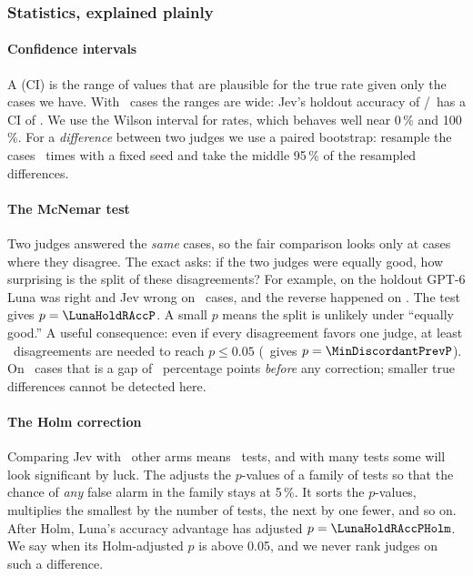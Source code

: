 \subsubsection{Statistics, explained plainly}\label{jb:sec:stats}

\paragraph{Confidence intervals} A  (CI) is the range of values that
are plausible for the true rate given only the cases we have. With \HoldN\ cases the ranges are wide:
Jev's holdout accuracy of \JevHoldAccK/\HoldN\ has a CI of \JevHoldAccCI. We use the Wilson interval for
rates, which behaves well near 0\,\% and 100\,\%. For a \emph{difference} between two judges we use a
paired bootstrap: resample the cases \BootstrapB\ times with a fixed seed and take the middle 95\,\% of
the resampled differences.

\paragraph{The McNemar test} Two judges answered the \emph{same} cases, so the fair comparison looks
only at cases where they disagree. The exact  asks: if the two judges were equally
good, how surprising is the split of these disagreements? For example, on the holdout GPT-6 Luna was
right and Jev wrong on \LunaHoldRAccCandOnly\ cases, and the reverse happened on
\LunaHoldRAccBaseOnly. The test gives $p = \LunaHoldRAccP$. A small $p$ means the split is unlikely
under ``equally good.'' A useful consequence: even if every disagreement favors one judge, at least
\MinDiscordant\ disagreements are needed to reach $p \le 0.05$ (\MinDiscordantPrev\ gives
$p = \MinDiscordantPrevP$). On \HoldN\ cases that is a gap of \HoldMinDetectPts\ percentage points
\emph{before} any correction; smaller true differences cannot be detected here.

\paragraph{The Holm correction} Comparing Jev with \RuleOneFamilyHold\ other arms means
\RuleOneFamilyHold\ tests, and with many tests some will look significant by luck. The
 adjusts the $p$-values of a family of tests so that the chance of \emph{any}
false alarm in the family stays at 5\,\%. It sorts the $p$-values, multiplies the smallest by the number
of tests, the next by one fewer, and so on. After Holm, Luna's accuracy advantage has adjusted
$p = \LunaHoldRAccPHolm$. We say  when its Holm-adjusted $p$ is above
0.05, and we never rank judges on such a difference.

